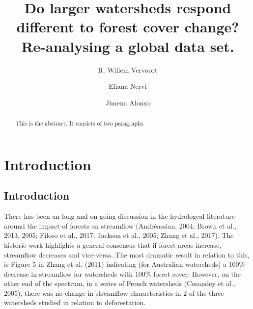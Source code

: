 \documentclass[]{elsarticle} %
\begin{document}
\begin{frontmatter}

  \title{Do larger watersheds respond different to forest cover change?
Re-analysing a global data set.}
    \author[DARE, The University of Sydney]{R. Willem Vervoort}
    \author[INIA]{Eliana Nervi}
    \author[IMFIA]{Jimena Alonso}
      \address[DARE]{ARC Training Centre Data Analytics for Resources and the Environment}
    \address[The University of Sydney]{School of Life and Environmental Sciences, The University of Sydney,
Sydney, NSW 2006, Australia}
    \address[INIA]{Project Manager, FPTA 357 Instituto Nacional de Investigación
Agropecuaria, INIA-Uruguay, Ruta 48 km 10, Rincon del Colorado, 90100
Canelones, Uruguay}
    \address[IMFIA]{Institute of Fluid Mechanics and Environmental Engineering, School of
Engineering, Universidad de la República, 11200 Montevideo, Uruguay}
  
  \begin{abstract}
  This is the abstract. It consists of two paragraphs.
  \end{abstract}
  
 \end{frontmatter}

\hypertarget{introduction}{%
\section{Introduction}\label{introduction}}

\hypertarget{introduction-1}{%
\subsection{Introduction}\label{introduction-1}}

There has been an long and on-going discussion in the hydrologcal
literature around the impact of forests on streamflow (Andréassian,
2004; Brown et al., 2013, 2005; Filoso et al., 2017; Jackson et al.,
2005; Zhang et al., 2017). The historic work highlights a general
consensus that if forest areas increase, streamflow decreases and
vice-versa. The most dramatic result in relation to this, is Figure 5 in
Zhang et al. (2011) indicating (for Australian watersheds) a 100\%
decrease in streamflow for watersheds with 100\% forest cover. However,
on the other end of the spectrum, in a series of French watersheds
(Cosandey et al., 2005), there was no change in streamflow
characteristics in 2 of the three watersheds studied in relation to
deforestation.
\end{document}
